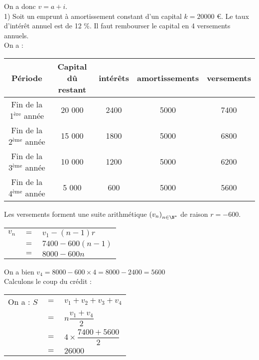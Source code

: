 On a donc $v = a + i$. \\

1) Soit un emprunt à amortissement constant d'un capital $k = 20 000$ €. Le taux d'intérêt annuel est de 12 \%. Il faut rembourser le capital en 4 versements annuels. \\

On a : \\

\begin{tabular}{|c|c|c|c|c|}
\hline
Période & Capital dû restant & intérêts & amortissements & versements \\
\hline
Fin de la 1$^{\mathrm{ère}}$ année & 20 000 & 2400 & 5000 & 7400 \\
\hline
Fin de la 2$^{\mathrm{ème}}$ année & 15 000 & 1800 & 5000 & 6800 \\
\hline
Fin de la 3$^{\mathrm{ème}}$ année & 10 000 &  1200 & 5000 & 6200 \\
\hline
Fin de la 4$^{\mathrm{ème}}$ année & 5 000 & 600 & 5000 & 5600 \\
\hline
\end{tabular}

\vspace*{.3cm}

Les versements forment une suite arithmétique $\left(v_n\right)_{n\in \N^*}$ de raison $r = -600$. \\

\begin{tabular}{lll}
$v_n$ & $ = $ & $ v_1 - \left(n-1\right)r$ \\
& $=$ & $7400 - 600\left(n-1\right)$ \\
& $=$ & $8000 - 600n$ \\
\end{tabular}

\vspace*{.3cm}

On a bien $v_4 = 8000 - 600 \times 4 = 8000 - 2400 = 5600$ \\

Calculons le coup du crédit : \\

\begin{tabular}{rll}
On a : $S$ & $=$ & $v_1 + v_2 + v_3 + v_4$ \vspace*{.3cm} \\
& $=$ & $n \dfrac{v_1 + v_4}{2}$ \vspace*{.3cm} \\
& $=$ & $4 \times \dfrac{7400 + 5600}{2}$ \vspace*{.3cm} \\
& $=$ & $26000$ \\
\end{tabular}

